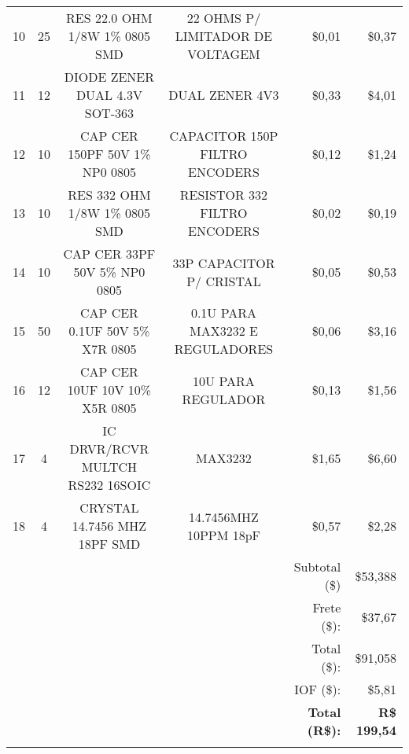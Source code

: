\begin{table}[!h]
\begin{tabular}{rrccrr}
    \multicolumn{1}{c}{10} & \multicolumn{1}{c}{25} & \multicolumn{1}{c}{RES 22.0 OHM 1/8W 1\% 0805 SMD} & \multicolumn{1}{c}{22 OHMS P/ LIMITADOR DE VOLTAGEM} & \$0,01 & \$0,37 \\
    \multicolumn{1}{c}{11} & \multicolumn{1}{c}{12} & \multicolumn{1}{c}{DIODE ZENER DUAL 4.3V SOT-363} & \multicolumn{1}{c}{DUAL ZENER 4V3} & \$0,33 & \$4,01 \\
    \multicolumn{1}{c}{12} & \multicolumn{1}{c}{10} & \multicolumn{1}{c}{CAP CER 150PF 50V 1\% NP0 0805} & \multicolumn{1}{c}{CAPACITOR 150P FILTRO ENCODERS} & \$0,12 & \$1,24 \\
    \multicolumn{1}{c}{13} & \multicolumn{1}{c}{10} & \multicolumn{1}{c}{RES 332 OHM 1/8W 1\% 0805 SMD} & \multicolumn{1}{c}{RESISTOR 332 FILTRO ENCODERS} & \$0,02 & \$0,19 \\
    \multicolumn{1}{c}{14} & \multicolumn{1}{c}{10} & \multicolumn{1}{c}{CAP CER 33PF 50V 5\% NP0 0805} & \multicolumn{1}{c}{33P CAPACITOR P/ CRISTAL} & \$0,05 & \$0,53 \\
    \multicolumn{1}{c}{15} & \multicolumn{1}{c}{50} & \multicolumn{1}{c}{CAP CER 0.1UF 50V 5\% X7R 0805} & \multicolumn{1}{c}{0.1U PARA MAX3232 E REGULADORES} & \$0,06 & \$3,16 \\
    \multicolumn{1}{c}{16} & \multicolumn{1}{c}{12} & \multicolumn{1}{c}{CAP CER 10UF 10V 10\% X5R 0805} & \multicolumn{1}{c}{10U PARA REGULADOR} & \$0,13 & \$1,56 \\
    \multicolumn{1}{c}{17} & \multicolumn{1}{c}{4} & \multicolumn{1}{c}{IC DRVR/RCVR MULTCH RS232 16SOIC} & \multicolumn{1}{c}{MAX3232} & \$1,65 & \$6,60 \\
    \multicolumn{1}{c}{18} & \multicolumn{1}{c}{4} & \multicolumn{1}{c}{CRYSTAL 14.7456 MHZ 18PF SMD} & \multicolumn{1}{c}{14.7456MHZ 10PPM 18pF} & \$0,57 & \$2,28 \\
          &       &       &       & Subtotal (\$) & \$53,388 \\
          &       &       &       & Frete (\$): & \$37,67 \\
          &       &       &       & Total (\$): & \$91,058 \\
          &       &       &       & IOF (\$): & \$5,81 \\
          &       &       &       & \textbf{Total (R\$):} & \textbf{R\$ 199,54} \\
          &       &       &       &       &  \\


\end{tabular}
\end{table}
